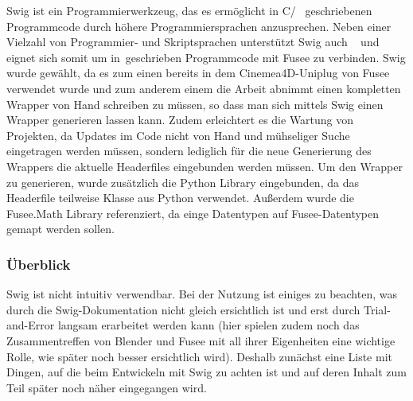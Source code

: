  \label{sec:Umsetzung}

\label{sec:SWIG}

Swig ist ein Programmierwerkzeug, das es ermöglicht in C/\CC~ geschriebenen Programmcode durch höhere Programmiersprachen anzusprechen. Neben einer Vielzahl von Programmier- und Skriptsprachen unterstützt Swig auch \CS~ und eignet sich somit um in\CC~geschrieben Programmcode mit Fusee zu verbinden. Swig wurde gewählt, da es zum einen bereits in dem Cinemea4D-Uniplug von Fusee verwendet wurde und zum anderem einem die Arbeit abnimmt einen kompletten Wrapper von Hand schreiben zu müssen, so dass man sich mittels Swig einen Wrapper generieren lassen kann. Zudem erleichtert es die Wartung von Projekten, da Updates im Code nicht von Hand und mühseliger Suche eingetragen werden müssen, sondern lediglich für die neue Generierung des Wrappers die aktuelle Headerfiles eingebunden werden müssen.
Um den Wrapper zu generieren, wurde zusätzlich die Python Library eingebunden, da das Headerfile teilweise Klasse aus Python verwendet. Außerdem wurde die Fusee.Math Library referenziert, da einge Datentypen auf Fusee-Datentypen gemapt werden sollen.

\subsubsection{Überblick}
Swig ist nicht intuitiv verwendbar. Bei der Nutzung ist einiges zu beachten, was durch die Swig-Dokumentation nicht gleich ersichtlich ist und erst durch Trial-and-Error langsam erarbeitet werden kann (hier spielen zudem noch das Zusammentreffen von Blender und Fusee mit all ihrer Eigenheiten eine wichtige Rolle, wie später noch besser ersichtlich wird). Deshalb zunächst eine Liste mit Dingen, auf die beim Entwickeln mit Swig zu achten ist und auf deren Inhalt zum Teil später noch näher eingegangen wird.

